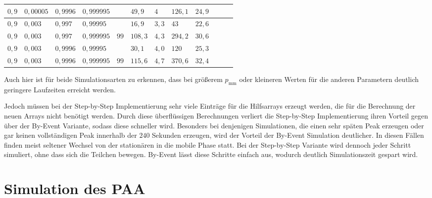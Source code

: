 \begin{table}[h]
\begin{tabular}{|l|l|l|l||l||l|l|l|l|l|l|l|}
$ 0,9  $ & $0,00005$ & $0,9996$ & $0,999995$ && $49,9   $ & $4 $     & $126,1 $ & $24,9 $  \\ \hline
$ 0,9  $ & $0,003 $  & $0,997$  & $0,99995$  && $16,9   $ & $3,3 $   & $43    $ & $22,6 $  \\ \hline
\cellcolor{gray!40}$ 0,9  $ & \cellcolor{gray!40}$0,003 $  & \cellcolor{gray!40}$0,997$  & \cellcolor{gray!40}$0,999995$ &$99$& $108,3$ & $4,3   $ & $294,2 $ & $30,6 $  \\ \hline
$ 0,9  $ & $0,003 $  & $0,9996$ & $0,99995$  && $30,1   $ & $4,0 $   & $120 $   & $25,3 $  \\ \hline
\cellcolor{gray!40}$ 0,9  $ & \cellcolor{gray!40}$0,003 $  & \cellcolor{gray!40}$0,9996$ & \cellcolor{gray!40}$0,999995$ &$99$& $115,6$ & $4,7   $ & $370,6 $ & $32,4$  \\ \hline
\end{tabular}
\end{table}
Auch hier ist für beide Simulationsarten zu erkennen, dass bei größerem $p_\text{mm}$ oder kleineren Werten für die anderen Parametern deutlich geringere Laufzeiten erreicht werden.

Jedoch müssen bei der Step-by-Step Implementierung sehr viele Einträge für die Hilfsarrays erzeugt werden, die für die Berechnung der neuen Arrays nicht benötigt werden. Durch diese überflüssigen Berechnungen verliert die Step-by-Step Implementierung ihren Vorteil gegen über der By-Event Variante, sodass diese schneller wird. Besonders bei denjenigen Simulationen, die einen sehr späten Peak erzeugen oder gar keinen vollständigen Peak innerhalb der $240$ Sekunden erzeugen, wird der Vorteil der By-Event Simulation deutlicher. In diesen Fällen finden meist seltener Wechsel von der stationären in die mobile Phase statt. Bei der Step-by-Step Variante wird dennoch jeder Schritt simuliert, ohne dass sich die Teilchen bewegen. By-Event lässt diese Schritte einfach aus, wodurch deutlich Simulationszeit gespart wird. 

\section{Simulation des PAA}

